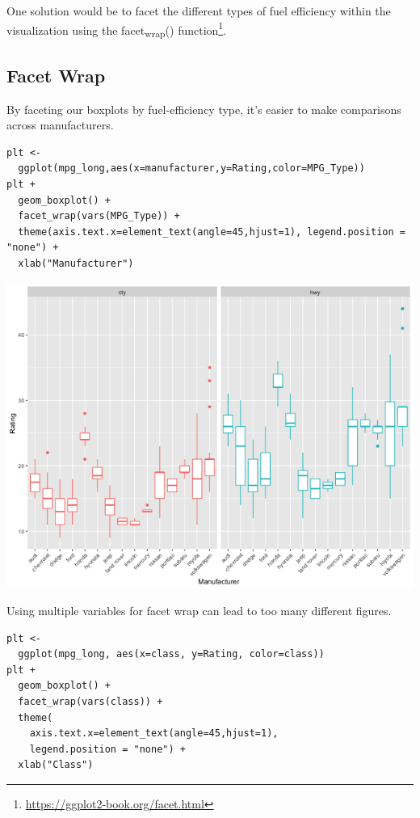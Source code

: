 \documentclass[11pt]{article}
\begin{document}
One solution would be to facet the different types of fuel efficiency within the visualization using the facet\textsubscript{wrap}() function\footnote{\url{https://ggplot2-book.org/facet.html}}.

\subsection{Facet Wrap}
\label{sec:org9c517c6}

By faceting our boxplots by fuel-efficiency type, it's easier to make comparisons across manufacturers.

\begin{verbatim}
plt <-
  ggplot(mpg_long,aes(x=manufacturer,y=Rating,color=MPG_Type))
plt +
  geom_boxplot() +
  facet_wrap(vars(MPG_Type)) +
  theme(axis.text.x=element_text(angle=45,hjust=1), legend.position = "none") +
  xlab("Manufacturer")
\end{verbatim}

\begin{org}
\begin{center}
\includegraphics[width=.9\linewidth]{./resources/mpg_facetwrap.png}
\end{center}
\end{org}

Using multiple variables for facet wrap can lead to too many different figures.

\begin{verbatim}
plt <-
  ggplot(mpg_long, aes(x=class, y=Rating, color=class))
plt +
  geom_boxplot() +
  facet_wrap(vars(class)) +
  theme(
    axis.text.x=element_text(angle=45,hjust=1),
    legend.position = "none") +
  xlab("Class")
\end{verbatim}
\end{document}
